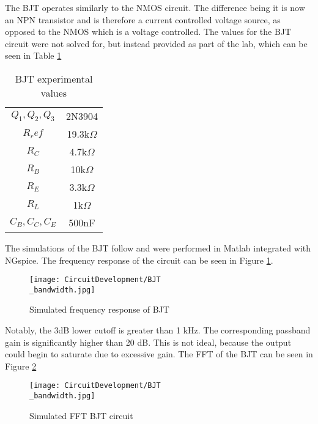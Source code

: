 
The BJT operates similarly to the NMOS circuit. The difference being it is now an NPN transistor and is therefore a current controlled voltage source, as opposed to the NMOS which is a voltage controlled. The values for the BJT circuit were not solved for, but instead provided as part of the lab, which can be seen in Table \ref{tab:bjttab}

\begin{table}[H]
	\centering
	\caption{BJT experimental values}
	\label{tab:bjttab}
	\begin{tabular}{cc}
		$Q_1, Q_2, Q_3$ & 2N3904        \\
		$R_ref$         & 19.3k$\Omega$ \\
		$R_C$           & 4.7k$\Omega$  \\
		$R_B$           & 10k$\Omega$   \\
		$R_E$           & 3.3k$\Omega$  \\
		$R_L$           & 1k$\Omega$    \\
		$C_B, C_C, C_E$ & 500nF        
	\end{tabular}
\end{table}

 The simulations of the BJT follow and were performed in Matlab integrated with NGspice. The frequency response of the circuit can be seen in Figure \ref{fig:bjtsimfreq}. 

\begin{figure}[H]
	\centering
	\texttt{[image: CircuitDevelopment/BJT\\\_bandwidth.jpg]}
	\caption{Simulated frequency response of BJT}
	\label{fig:bjtsimfreq}
\end{figure}

Notably, the 3dB lower cutoff is greater than 1 kHz. The corresponding passband gain is significantly higher than 20 dB. This is not ideal, because the output could begin to saturate due to excessive gain. The FFT of the BJT can be seen in Figure \ref{fig:bjtFFT}

\begin{figure}[H]
	\centering
	\texttt{[image: CircuitDevelopment/BJT\\\_bandwidth.jpg]}
	\caption{Simulated FFT BJT circuit}
	\label{fig:bjtFFT}
\end{figure}



 



